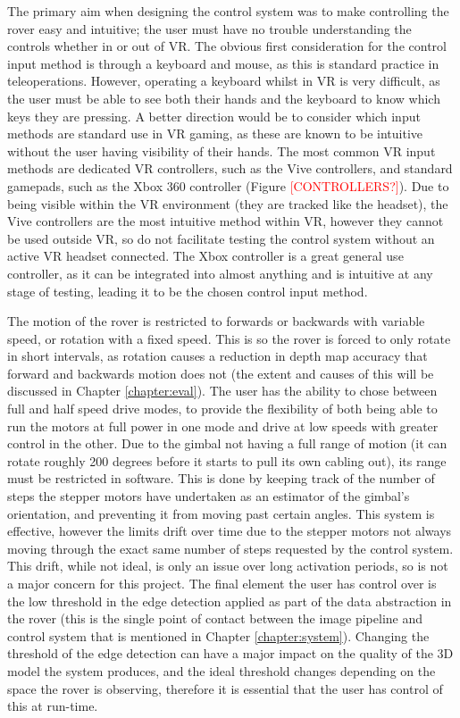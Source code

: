 The primary aim when designing the control system was to make controlling the rover easy and intuitive; the user must have no trouble understanding the controls whether in or out of VR. The obvious first consideration for the control input method is through a keyboard and mouse, as this is standard practice in teleoperations. However, operating a keyboard whilst in VR is very difficult, as the user must be able to see both their hands and the keyboard to know which keys they are pressing. A better direction would be to consider which input methods are standard use in VR gaming, as these are known to be intuitive without the user having visibility of their hands. The most common VR input methods are dedicated VR controllers, such as the Vive controllers, and standard gamepads, such as the Xbox 360 controller (Figure \textcolor{red}{[CONTROLLERS?]}). Due to being visible within the VR environment (they are tracked like the headset), the Vive controllers are the most intuitive method within VR, however they cannot be used outside VR, so do not facilitate testing the control system without an active VR headset connected. The Xbox controller is a great general use controller, as it can be integrated into almost anything and is intuitive at any stage of testing, leading it to be the chosen control input method.

The motion of the rover is restricted to forwards or backwards with variable speed, or rotation with a fixed speed. This is so the rover is forced to only rotate in short intervals, as rotation causes a reduction in depth map accuracy that forward and backwards motion does not (the extent and causes of this will be discussed in Chapter \ref{chapter:eval}). The user has the ability to chose between full and half speed drive modes, to provide the flexibility of both being able to run the motors at full power in one mode and drive at low speeds with greater control in the other. Due to the gimbal not having a full range of motion (it can rotate roughly 200 degrees before it starts to pull its own cabling out), its range must be restricted in software. This is done by keeping track of the number of steps the stepper motors have undertaken as an estimator of the gimbal's orientation, and preventing it from moving past certain angles. This system is effective, however the limits drift over time due to the stepper motors not always moving through the exact same number of steps requested by the control system. This drift, while not ideal, is only an issue over long activation periods, so is not a major concern for this project. The final element the user has control over is the low threshold in the edge detection applied as part of the data abstraction in the rover (this is the single point of contact between the image pipeline and control system that is mentioned in Chapter \ref{chapter:system}). Changing the threshold of the edge detection can have a major impact on the quality of the 3D model the system produces, and the ideal threshold changes depending on the space the rover is observing, therefore it is essential that the user has control of this at run-time.

